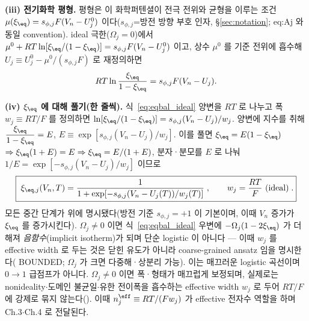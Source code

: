 \textbf{(iii) 전기화학 평형.} 평형은 이 화학퍼텐셜이 전극 전위와 균형을 이루는 조건
$\mu(\xi_\eq)=s_{\phi,j}F(V_n-U_j^0)$ 이다($s_{\phi,j}$=방전 방향 부호 인자, \S\ref{sec:notation};
eq:Aj 와 동일 convention). ideal 극한($\Omega_j=0$)에서 $\mu^0+RT\ln[\xi_\eq/(1-\xi_\eq)]
=s_{\phi,j}F(V_n-U_j^0)$ 이고, 상수 $\mu^0$ 를 기준 전위에 흡수해 $U_j\equiv U_j^0-\mu^0/(s_{\phi,j}F)$ 로
재정의하면
\begin{equation}
RT\ln\frac{\xi_\eq}{1-\xi_\eq}=s_{\phi,j}F(V_n-U_j).
\label{eq:eqbal_ideal}
\end{equation}

\textbf{(iv) $\xi_\eq$ 에 대해 풀기(한 줄씩).} 식~\eqref{eq:eqbal_ideal} 양변을 $RT$ 로 나누고 폭
$w_j\equiv RT/F$ 를 정의하면 $\ln[\xi_\eq/(1-\xi_\eq)]=s_{\phi,j}(V_n-U_j)/w_j$. 양변에 지수를 취해
$\dfrac{\xi_\eq}{1-\xi_\eq}=E$, $E\equiv\exp[s_{\phi,j}(V_n-U_j)/w_j]$. 이를 풀면 $\xi_\eq=E(1-\xi_\eq)$
$\Rightarrow\xi_\eq(1+E)=E\Rightarrow\xi_\eq=E/(1+E)$, 분자·분모를 $E$ 로 나눠 $1/E=\exp[-s_{\phi,j}(V_n-U_j)/w_j]$
이므로
\begin{equation}
\boxed{\;\xi_{\eq,j}(V_n,T)=\frac{1}{1+\exp[-s_{\phi,j}(V_n-U_j(T))/w_j(T)]}\;,\qquad w_j=\frac{RT}{F}\ (\text{ideal})\;.}
\label{eq:logistic}
\end{equation}
모든 중간 단계가 위에 명시됐다(방전 기준 $s_{\phi,j}=+1$ 이 기본이며, 이때 $V_n$ 증가가 $\xi_\eq$ 를 증가시킨다).
$\Omega_j\ne0$ 이면 식~\eqref{eq:eqbal_ideal} 우변에 $-\Omega_j(1-2\xi_\eq)$ 가 더해져 \emph{음함수}(implicit
isotherm)가 되며 단순 logistic 이 아니다 — 이때 $w_j$ 를 effective width 로 두는 것은 닫힌 유도가 아니라
coarse-grained ansatz 임을 명시한다( BOUNDED; $\Omega_j$ 가 크면 다중해·상분리 가능). 이는 매끄러운 logistic 곡선이며 $0\!\to\!1$ 급점프가
아니다. $\Omega_j\ne0$ 이면 폭·형태가 매끄럽게 보정되며, 실제로는 nonideality$\cdot$도메인 불균일$\cdot$유한
전이폭을 흡수하는 effective width $w_j$ 로 두어 $RT/F$ 에 강제로 묶지 않는다(). 이때
$n_j^{\eff}\equiv RT/(Fw_j)$ 가 effective 전자수 역할을 하며 Ch.3$\cdot$Ch.4 로 전달된다.

